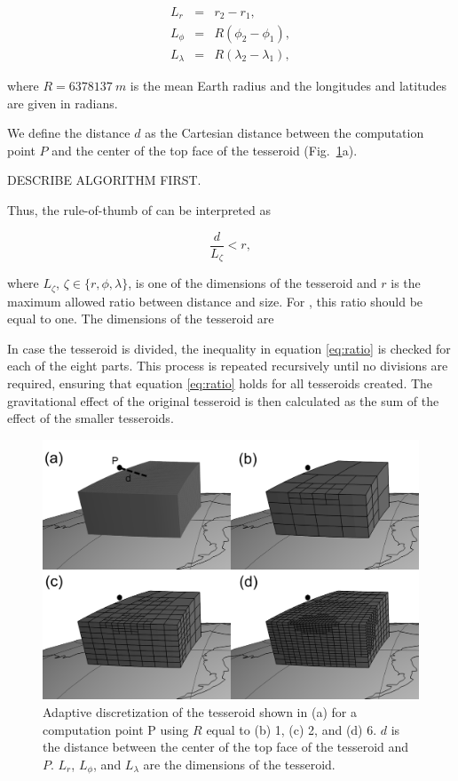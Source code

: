 \begin{eqnarray}
    L_r &=& r_2 - r_1,\\
    L_\phi &=& R(\phi_2 - \phi_1),\\
    L_\lambda &=& R(\lambda_2 - \lambda_1),
\end{eqnarray}

\noindent
where $R=6378137\ m$ is the mean Earth radius
and the longitudes and latitudes are given in radians.

We define the distance $d$ as
the Cartesian distance between
the computation point $P$
and the center of the top face of the tesseroid
(Fig.~\ref{fig:ratio}a).

DESCRIBE ALGORITHM FIRST.

Thus, the rule-of-thumb of \citet{Ku1977}
can be interpreted as

\begin{equation}
    \frac{d}{L_\zeta} < r,
    \label{eq:ratio}
\end{equation}

\noindent
where
$L_\zeta$, $\zeta \in \{r, \phi, \lambda\}$,
is one of the dimensions of the tesseroid
and
$r$ is the maximum allowed ratio between distance and size.
For \citet{Ku1977}, this ratio should be equal to one.
The dimensions of the tesseroid are


In case the tesseroid is divided,
the inequality in equation \ref{eq:ratio}
is checked for each of the eight parts.
This process is repeated recursively
until no divisions are required,
ensuring that equation \ref{eq:ratio}
holds for all tesseroids created.
The gravitational effect
of the original tesseroid
is then calculated as
the sum of the effect
of the smaller tesseroids.

\begin{figure}
    \centering
    \includegraphics{figs/tesseroid-split}
    \caption{
        Adaptive discretization
        of the tesseroid shown in (a)
        for a computation point P
        using $R$ equal to
        (b) 1, (c) 2, and (d) 6.
        $d$ is the distance between
        the center of the top face of the tesseroid
        and $P$.
        $L_r$, $L_\phi$, and $L_\lambda$ are the dimensions of the tesseroid.
    }
    \label{fig:ratio}
\end{figure}

